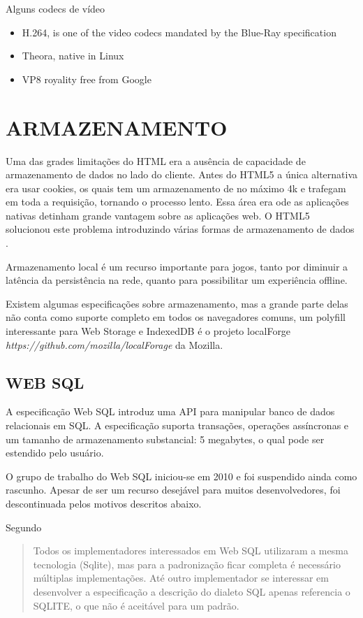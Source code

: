 \begin{draft}
Alguns codecs de vídeo
\begin{itemize}
    \item{H.264, is one of the video codecs mandated by the Blue-Ray specification}
    \item{Theora, native in Linux}
    \item{VP8 royality free from Google}
\end{itemize}

\end{draft}
\section{ARMAZENAMENTO}
Uma das grades limitações do HTML era a ausência de capacidade de
armazenamento de dados no lado do cliente. Antes do HTML5 a única
alternativa era usar cookies, os quais tem um armazenamento de no
máximo 4k e trafegam em toda a requisição, tornando o processo lento.
Essa área era ode as aplicações nativas detinham grande vantagem
sobre as aplicações web. O HTML5 solucionou este problema introduzindo
várias formas de armazenamento de dados \autocite{html5Tradeoffs}.

Armazenamento local é um recurso importante para jogos, tanto por
diminuir a latência da persistência na rede, quanto para possibilitar
um experiência offline.

Existem algumas especificações sobre armazenamento, mas a grande
parte delas não conta como suporte completo em todos os navegadores
comuns, um polyfill interessante para Web Storage  e IndexedDB é o
projeto localForge \textit{https://github.com/mozilla/localForage} da
Mozilla.

\subsection{WEB SQL}

A especificação Web SQL introduz uma API para manipular banco de dados
relacionais em SQL. A especificação suporta transações, operações
assíncronas e um tamanho de armazenamento substancial: 5 megabytes, o
qual pode ser estendido pelo usuário.

O grupo de trabalho do Web SQL iniciou-se em 2010 e foi suspendido ainda
como rascunho. Apesar de ser um recurso desejável para muitos
desenvolvedores, foi descontinuada pelos motivos descritos abaixo.

Segundo \cite{diveIntohtml}
\begin{quote}
Todos os implementadores interessados em Web SQL utilizaram a mesma
tecnologia (Sqlite), mas para a padronização ficar completa é
necessário múltiplas implementações. Até outro implementador se
interessar em desenvolver a especificação a descrição do dialeto SQL
apenas referencia o SQLITE, o que não é aceitável para um padrão.
\end{quote}

